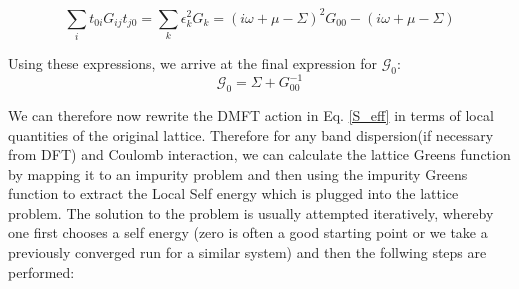 \documentclass[12pt,letter]{article}
\begin{document}
  \begin{equation}
  \sum_{i} t_{0i} G_{ij} t_{j0} = \sum_{k}\epsilon^2_k G_k= (i\omega +\mu -\Sigma)^2G_{00} -(i\omega +\mu -\Sigma)
  \end{equation} 
  
  Using these expressions, we arrive at the final expression for $\mathcal{G}_0$:
  \begin{equation}
  \mathcal{G}_0=\Sigma + G_{00}^{-1}
  \end{equation}
  
 We can therefore now rewrite the DMFT action in Eq. \ref{S_eff} in terms of local quantities of the original lattice. Therefore for any band dispersion(if necessary from DFT) and Coulomb interaction, we can calculate the lattice Greens function by mapping it to an impurity problem and then using the impurity Greens function to extract the Local Self energy which is plugged into the lattice problem. 
The solution to the problem is usually attempted iteratively, whereby one first chooses a self energy (zero is often a good starting point or we take a previously converged run for a similar system) and then the follwing steps are performed:
\end{document}
